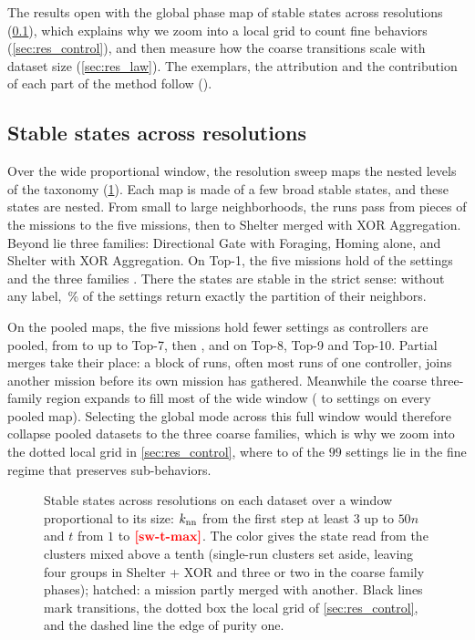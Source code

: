 \documentclass[pdflatex,sn-apa]{sn-jnl}
\begin{document}
The results open with the global phase map of stable states across resolutions (\cref{sec:res_states}), which explains
why we zoom into a local grid to count fine behaviors (\cref{sec:res_control}), and then measure how the coarse
transitions scale with dataset size (\cref{sec:res_law}). The exemplars, the attribution and the contribution of each
part of the method follow ().

\subsection{Stable states across resolutions}
\label{sec:res_states}

Over the wide proportional window, the resolution sweep maps the nested levels of the taxonomy (\cref{fig:states}).
Each map is made of a few broad stable states, and these states are nested. From small to large neighborhoods, the
runs pass from pieces of the missions to the five missions, then to Shelter merged with XOR Aggregation. Beyond lie
three families: Directional Gate with Foraging, Homing alone, and Shelter with XOR Aggregation. On Top-1, the five
missions hold  of the  settings and the three families
. There the states are stable in the strict sense: without any label, \,\% of
the settings return exactly the partition of their neighbors.

On the pooled maps, the five missions hold fewer settings as controllers are pooled, from  to
 up to Top-7, then ,  and  on
Top-8, Top-9 and Top-10. Partial merges take their place: a block of runs, often most runs of one controller, joins
another mission before its own mission has gathered. Meanwhile the coarse three-family region expands to fill most of
the wide window ( to  settings on every pooled map). Selecting the
global mode across this full window would therefore collapse pooled datasets to the three coarse families, which is why
we zoom into the dotted local grid in \cref{sec:res_control}, where  to
 of the $99$ settings lie in the fine regime that preserves sub-behaviors.

\begin{figure}[!b]
\centering
{}
\caption{Stable states across resolutions on each dataset over a window proportional to its size: $k_{\mathrm{nn}}$ from the first
step at least $3$ up to $50n$ and $t$ from $1$ to $\nm{sw-t-max}$. The color gives the state read from the clusters mixed
above a tenth (single-run clusters set aside, leaving four groups in Shelter + XOR and three or two in the coarse
family phases); hatched: a mission partly merged with another. Black lines mark transitions, the dotted box the local
grid of \cref{sec:res_control}, and the dashed line the edge of purity one.}
\label{fig:states}
\end{figure}
\end{document}
